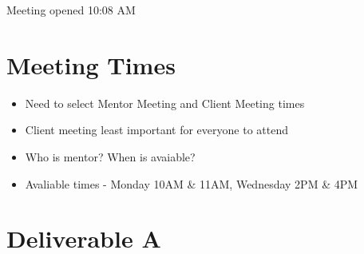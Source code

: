 
\date{8rd August, 2011}
\absent{-}


\maketitle{}

Meeting opened 10:08 AM

\section{Meeting Times}
\begin{itemize}
\item{Need to select Mentor Meeting and Client Meeting times}
\item{Client meeting least important for everyone to attend}
\item{Who is mentor? When is avaiable?}
\item{Avaliable times - Monday 10AM \& 11AM, Wednesday 2PM \& 4PM}
\end{itemize}

\section{Deliverable A}
\begin{itemize}

\end{itemize}


